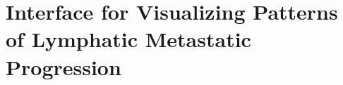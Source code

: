 \documentclass[\relativeRoot/main.tex]{subfiles}
\begin{document}
\section[Interface for Visualizing Patterns of Lymphatic Metastatic Progression]{Interface for Visualizing Patterns\\of Lymphatic Metastatic Progression}
\label{sec:previous_work:prototype_gui}
\end{document}

